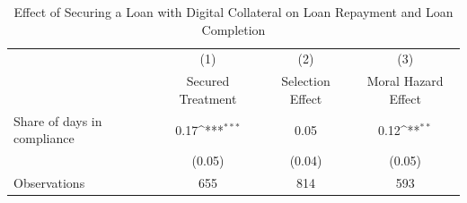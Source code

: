 \begin{table}[htbp]\centering
\def\sym#1{\ifmmode^{#1}\else\(^{#1}\)\fi}
\caption{Effect of Securing a Loan with Digital Collateral on Loan Repayment and Loan Completion\label{LASMH\_complete\_LATE\_150}}
\begin{tabular}{l*{3}{c}}
\toprule
                    &\multicolumn{1}{c}{(1)}&\multicolumn{1}{c}{(2)}&\multicolumn{1}{c}{(3)}\\
                    &\multicolumn{1}{c}{Secured Treatment}&\multicolumn{1}{c}{Selection Effect}&\multicolumn{1}{c}{Moral Hazard Effect}\\
\midrule
Share of days in compliance&        0.17\sym{***}&        0.05         &        0.12\sym{**} \\
                    &      (0.05)         &      (0.04)         &      (0.05)         \\
\midrule
Observations        &         655         &         814         &         593         \\
\bottomrule
\end{tabular}
\end{table}
